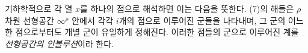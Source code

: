 
기하학적으로 각 열 $x$를 하나의 점으로 해석하면 이는 다음을 뜻한다. (7)의 해들은 $\rho$차원 선형공간 $\infty^\rho$ 안에서 각각 $i$개의 점으로 이루어진 군들을 나타내며, 그 군의 어느 한 점으로부터도 개별 군이 유일하게 정해진다. 이러한 점들의 군으로 이루어진 계를 \glqq{}\emph{선형공간의 인볼루션}\grqq{}이라 한다.
